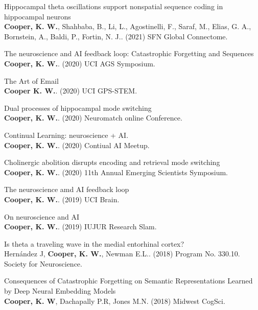 \documentclass[10pt]{cooperCV2}
\begin{document}
\begin{etaremune}[itemindent=-1.5\bibhang, topsep=0pt,
				   itemsep=\bibsep,partopsep=0pt,parsep=0pt,leftmargin={\bibhang+\widthof{[999]}}]
	
    \item Hippocampal theta oscillations support nonspatial sequence coding in hippocampal neurons\\ \textbf{Cooper, K. W.}, Shahbaba, B., Li, L., Agostinelli, F., Saraf, M., Elias, G. A., Bornstein, A., Baldi, P.,  Fortin, N. J.. (2021) SFN Global Connectome. 
     
	
    \item The neuroscience and AI feedback loop: Catastrophic Forgetting and Sequences\\ \textbf{Cooper, K. W.}. (2020) UCI AGS Symposium. 
     
	
    \item The Art of Email\\ \textbf{Cooper K. W.}. (2020) UCI GPS-STEM. 
     
	
    \item Dual processes of hippocampal mode switching\\ \textbf{Cooper, K. W.}. (2020) Neuromatch online Conference. 
     
	
    \item Continual Learning: neuroscience + AI.\\ \textbf{Cooper, K. W.}. (2020) Contiual AI Meetup. 
     
	
    \item Cholinergic abolition disrupts encoding and retrieval mode switching\\ \textbf{Cooper, K. W.}. (2020) 11th Annual Emerging Scientists Symposium. 
     
	
    \item The neuroscience amd AI feedback loop\\ \textbf{Cooper, K. W.}. (2019) UCI Brain. 
     
	
    \item On neuroscience and AI\\ \textbf{Cooper, K. W.}. (2019) IUJUR Research Slam. 
     
	
    \item Is theta a traveling wave in the medial entorhinal cortex?\\ Hernández J, \textbf{Cooper, K. W.}, Newman E.L.. (2018) Program No. 330.10. Society for Neuroscience. 
     
	
    \item Consequences of Catastrophic Forgetting on Semantic Representations Learned by Deep Neural Embedding Models\\ \textbf{Cooper, K. W}, Dachapally P.R, Jones M.N. (2018) Midwest CogSci. 
     

\end{etaremune}
\end{document}
